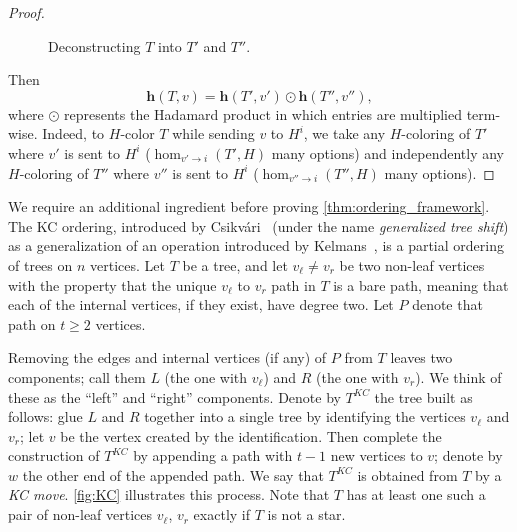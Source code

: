 \documentclass[11pt]{article}
\theoremstyle{definition}
\newcommand{\homclass}[4]{\hom_{#1\to#2}(#3,#4)}
\begin{document}
\begin{proof}
\begin{figure}[ht]
    \caption{Deconstructing $T$ into $T'$ and $T''$.} \label{fig:decomposition}
\end{figure}

Then
\[ \mathbf{h}(T,v) = \mathbf{h}(T',v') \odot \mathbf{h}(T'',v''),\]
where $\odot$ represents the Hadamard product in which entries are multiplied term-wise. Indeed, to $H$-color $T$ while sending $v$ to $H^i$, we take any $H$-coloring of $T'$ where $v'$ is sent to $H^i$  ($\homclass{v'}{i}{T'}{H}$ many options) and independently any $H$-coloring of $T''$ where $v''$ is sent to $H^i$ ($\homclass{v''}{i}{T''}{H}$ many options). 
\end{proof}

We require an additional ingredient before proving \cref{thm:ordering_framework}. The KC ordering, introduced by Csikv\'ari~\cite{Csikvari2010} (under the name \emph{generalized tree shift}) as a generalization of an operation introduced by Kelmans~\cite{Kelmans1981}, is a partial ordering of trees on $n$ vertices. Let $T$ be a tree, and let $v_\ell \ne v_r$ be two non-leaf vertices with the property that the unique $v_\ell$ to $v_r$ path in $T$ is a bare path, meaning that each of the internal vertices, if they exist, have degree two. Let $P$ denote that path on $t \ge 2$ vertices.

Removing the edges and internal vertices (if any) of $P$ from $T$ leaves two components; call them $L$ (the one with $v_\ell$) and $R$ (the one with $v_r$). We think of these as the ``left'' and ``right'' components. Denote by $T^{KC}$ the tree built as follows: glue $L$ and $R$ together into a single tree by identifying the vertices $v_\ell$ and $v_r$; let $v$ be the vertex created by the identification. Then complete the construction of $T^{KC}$ by appending a path with $t-1$ new vertices to $v$; denote by $w$ the other end of the appended path. We say that $T^{KC}$ is obtained from $T$ by a {\it KC move}. \cref{fig:KC} illustrates this process. Note that $T$ has at least one such a pair of non-leaf vertices $v_\ell$, $v_r$ exactly if $T$ is not a star.
\end{document}
